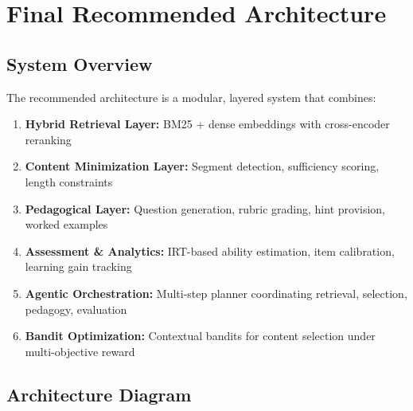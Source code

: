 \documentclass[11pt,letterpaper]{article}
\begin{document}
\newpage

\section{Final Recommended Architecture}

\subsection{System Overview}

The recommended architecture is a modular, layered system that combines:
\begin{enumerate}
\item \textbf{Hybrid Retrieval Layer:} BM25 + dense embeddings with cross-encoder reranking
\item \textbf{Content Minimization Layer:} Segment detection, sufficiency scoring, length constraints
\item \textbf{Pedagogical Layer:} Question generation, rubric grading, hint provision, worked examples
\item \textbf{Assessment \& Analytics:} IRT-based ability estimation, item calibration, learning gain tracking
\item \textbf{Agentic Orchestration:} Multi-step planner coordinating retrieval, selection, pedagogy, evaluation
\item \textbf{Bandit Optimization:} Contextual bandits for content selection under multi-objective reward
\end{enumerate}

\subsection{Architecture Diagram}
\end{document}
